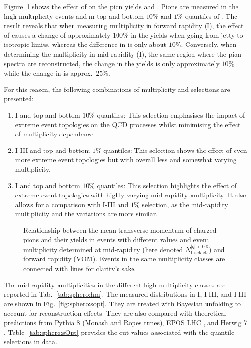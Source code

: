 Figure~\ref{fig:sphero:v0mvscl1} shows the effect of \SOPT on the pion yields and \meanpt. Pions are measured in the high-multiplicity events and in top and bottom $10\%$ and $1\%$ quantiles of \SOPT. The result reveals that when measuring multiplicity in forward rapidity (\VOM I), the effect of \SOPT causes a change of approximately $100\%$ in the yields when going from jetty to isotropic limits, whereas the difference in \meanpt is only about $10\%$. Conversely, when determining the multiplicity in mid-rapidity (\NSPD I), the same region where the pion spectra are reconstructed, the change in the yields is only approximately $10\%$ while the change in \meanpt is approx.\ $25\%$.

For this reason, the following combinations of multiplicity and \SOPT selections are presented:
\begin{enumerate}
\item \NSPD I and \SOPT top and bottom $10\%$ quantiles: This selection emphasises the impact of extreme event topologies on the QCD processes whilst minimising the effect of multiplicity dependence.
\item \NSPD I-III and \SOPT top and bottom $1\%$ quantiles: This selection shows the effect of even more extreme event topologies but with overall less and somewhat varying multiplicity. 
\item \VOM I and \SOPT top and bottom $10\%$ quantiles: This selection highlights the effect of extreme event topologies with highly varying mid-rapidity multiplicity. It also allows for a comparison with \NSPD I-III and \SOPT $1\%$ selection, as the mid-rapidity multiplicity and the \meanpt variations are more similar.
\end{enumerate}

\begin{figure}%
\caption{Relationship between the mean transverse momentum of charged pions and their yields in events with different \SOPT values and event multiplicity determined at mid-rapidity (here denoted $N_\mathrm{tracklets}^{|\eta|<0.8}$) and forward rapidity (VOM). Events in the same multiplicity classes are connected with lines for clarity's sake.}
\label{fig:sphero:v0mvscl1}
\end{figure}

The mid-rapidity multiplicities in the different high-multiplicity classes are reported in Tab.~\ref{tab:sphero:hm}. The measured \SOPT distributions in \NSPD I, \NSPD I-III, and \VOM I-III are shown in Fig.~\ref{fig:sphero:sopt}. They are treated with Bayesian unfolding to account for reconstruction effects. They are also compared with theoretical predictions from Pythia 8 (Monash \cite{skandsTuningPYTHIAMonash2014} and Ropes \cite{bierlichEffectsOverlappingStrings2015} tunes), EPOS LHC \cite{pierogEPOSLHCTest2015}, and Herwig 7 \cite{bellmHerwigReleaseNote2020}. Table~\ref{tab:sphero:sOpt} provides the \SOPT cut values associated with the quantile selections in data.

